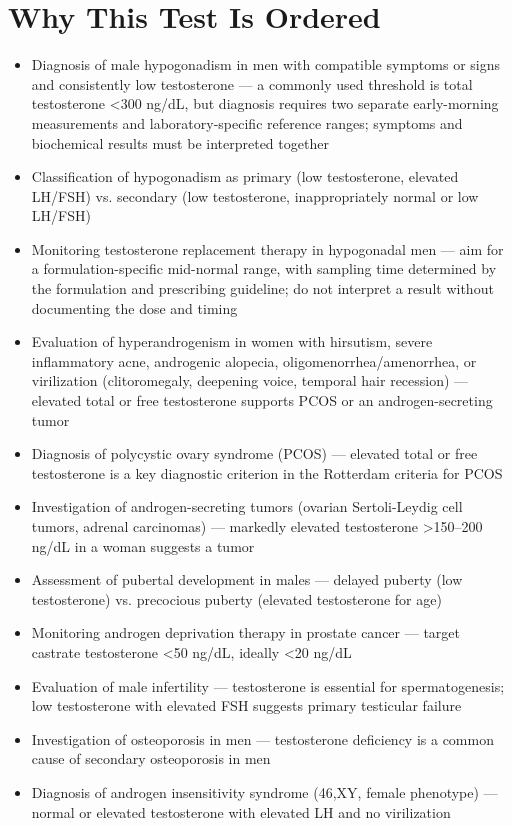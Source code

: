 \section*{Why This Test Is Ordered}
\begin{itemize}
  \item Diagnosis of male hypogonadism in men with compatible symptoms or signs and consistently low testosterone --- a commonly used threshold is total testosterone <300 ng/dL, but diagnosis requires two separate early-morning measurements and laboratory-specific reference ranges; symptoms and biochemical results must be interpreted together \cite{bhasin2018testosterone}
  \item Classification of hypogonadism as primary (low testosterone, elevated LH/FSH) vs. secondary (low testosterone, inappropriately normal or low LH/FSH)
  \item Monitoring testosterone replacement therapy in hypogonadal men --- aim for a formulation-specific mid-normal range, with sampling time determined by the formulation and prescribing guideline; do not interpret a result without documenting the dose and timing \cite{bhasin2018testosterone}
  \item Evaluation of hyperandrogenism in women with hirsutism, severe inflammatory acne, androgenic alopecia, oligomenorrhea/amenorrhea, or virilization (clitoromegaly, deepening voice, temporal hair recession) --- elevated total or free testosterone supports PCOS or an androgen-secreting tumor
  \item Diagnosis of polycystic ovary syndrome (PCOS) --- elevated total or free testosterone is a key diagnostic criterion in the Rotterdam criteria for PCOS
  \item Investigation of androgen-secreting tumors (ovarian Sertoli-Leydig cell tumors, adrenal carcinomas) --- markedly elevated testosterone >150--200 ng/dL in a woman suggests a tumor
  \item Assessment of pubertal development in males --- delayed puberty (low testosterone) vs. precocious puberty (elevated testosterone for age)
  \item Monitoring androgen deprivation therapy in prostate cancer --- target castrate testosterone <50 ng/dL, ideally <20 ng/dL
  \item Evaluation of male infertility --- testosterone is essential for spermatogenesis; low testosterone with elevated FSH suggests primary testicular failure
  \item Investigation of osteoporosis in men --- testosterone deficiency is a common cause of secondary osteoporosis in men
  \item Diagnosis of androgen insensitivity syndrome (46,XY, female phenotype) --- normal or elevated testosterone with elevated LH and no virilization
\end{itemize}

